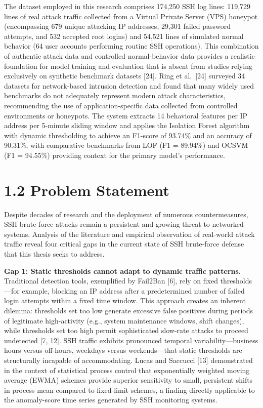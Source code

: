 \documentclass[
  a4paper]{report}
\begin{document}
The dataset employed in this research comprises 174,250 SSH log lines:
119,729 lines of real attack traffic collected from a Virtual Private
Server (VPS) honeypot (encompassing 679 unique attacking IP addresses,
29,301 failed password attempts, and 532 accepted root logins) and
54,521 lines of simulated normal behavior (64 user accounts performing
routine SSH operations). This combination of authentic attack data and
controlled normal-behavior data provides a realistic foundation for
model training and evaluation that is absent from studies relying
exclusively on synthetic benchmark datasets {[}24{]}. Ring et
al.~{[}24{]} surveyed 34 datasets for network-based intrusion detection
and found that many widely used benchmarks do not adequately represent
modern attack characteristics, recommending the use of
application-specific data collected from controlled environments or
honeypots. The system extracts 14 behavioral features per IP address per
5-minute sliding window and applies the Isolation Forest algorithm with
dynamic thresholding to achieve an F1-score of 93.74\% and an accuracy
of 90.31\%, with comparative benchmarks from LOF (F1 = 89.94\%) and
OCSVM (F1 = 94.55\%) providing context for the primary model's
performance.

\section{1.2 Problem Statement}\label{problem-statement}

Despite decades of research and the deployment of numerous
countermeasures, SSH brute-force attacks remain a persistent and growing
threat to networked systems. Analysis of the literature and empirical
observation of real-world attack traffic reveal four critical gaps in
the current state of SSH brute-force defense that this thesis seeks to
address.

\textbf{Gap 1: Static thresholds cannot adapt to dynamic traffic
patterns.} Traditional detection tools, exemplified by Fail2Ban {[}6{]},
rely on fixed thresholds---for example, blocking an IP address after a
predetermined number of failed login attempts within a fixed time
window. This approach creates an inherent dilemma: thresholds set too
low generate excessive false positives during periods of legitimate
high-activity (e.g., system maintenance windows, shift changes), while
thresholds set too high permit sophisticated slow-rate attacks to
proceed undetected {[}7, 12{]}. SSH traffic exhibits pronounced temporal
variability---business hours versus off-hours, weekdays versus
weekends---that static thresholds are structurally incapable of
accommodating. Lucas and Saccucci {[}13{]} demonstrated in the context
of statistical process control that exponentially weighted moving
average (EWMA) schemes provide superior sensitivity to small, persistent
shifts in process mean compared to fixed-limit schemes, a finding
directly applicable to the anomaly-score time series generated by SSH
monitoring systems.
\end{document}
